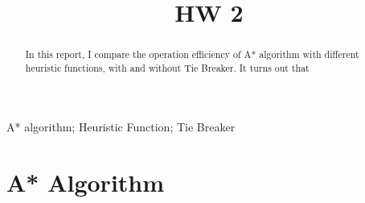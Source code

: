 \documentclass[conference]{IEEEtran}
\begin{document}
\title{HW 2\\
}

\author{
}

\maketitle

\begin{abstract}
In this report, I compare the operation efficiency of A* algorithm with different heuristic functions, with and without Tie Breaker. It turns out that 
\end{abstract}

\begin{IEEEkeywords}
A* algorithm; Heuristic Function; Tie Breaker
\end{IEEEkeywords}


\section{A* Algorithm}
\end{document}
